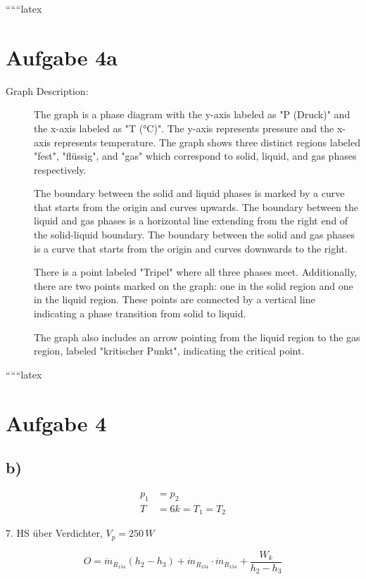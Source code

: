 
``````latex


\section*{Aufgabe 4a}

\begin{description}
    \item[Graph Description:] The graph is a phase diagram with the y-axis labeled as "P (Druck)" and the x-axis labeled as "T (°C)". The y-axis represents pressure and the x-axis represents temperature. The graph shows three distinct regions labeled "fest", "flüssig", and "gas" which correspond to solid, liquid, and gas phases respectively.
    
    The boundary between the solid and liquid phases is marked by a curve that starts from the origin and curves upwards. The boundary between the liquid and gas phases is a horizontal line extending from the right end of the solid-liquid boundary. The boundary between the solid and gas phases is a curve that starts from the origin and curves downwards to the right.
    
    There is a point labeled "Tripel" where all three phases meet. Additionally, there are two points marked on the graph: one in the solid region and one in the liquid region. These points are connected by a vertical line indicating a phase transition from solid to liquid.
    
    The graph also includes an arrow pointing from the liquid region to the gas region, labeled "kritischer Punkt", indicating the critical point.
\end{description}

``````latex


\section*{Aufgabe 4}

\subsection*{b)}

\begin{align*}
    p_1 &= p_2 \\
    T &= 6k = T_1 = T_2
\end{align*}

7. HS über Verdichter, \( V_p = 250 \, W \)

\[
O = \dot{m}_{R_{134}} \left( h_2 - h_3 \right) + \dot{m}_{R_{134}} \cdot \dot{m}_{R_{134}} + \frac{W_k}{h_2 - h_3}
\]

